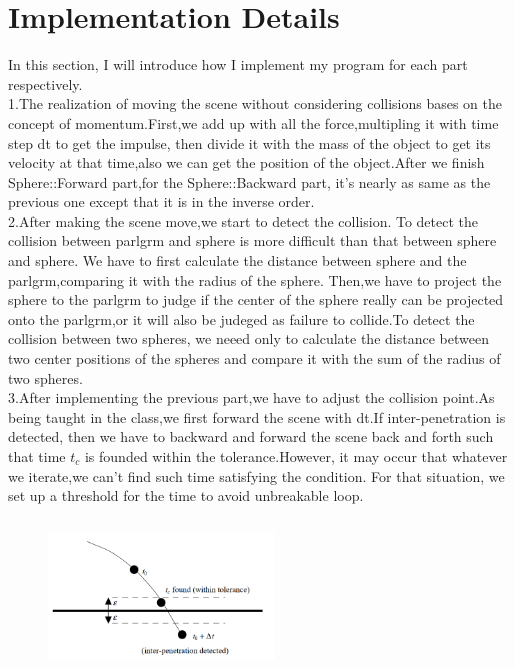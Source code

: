 \documentclass[acmtog]{acmart}
\begin{document}
\section{Implementation Details}
\qquad In this section, I will introduce how I implement my program for each part respectively.
\\\indent 1.The realization of moving the scene without considering collisions bases on the concept of momentum.First,we add up with all the force,multipling it with time step dt to get the impulse, then divide it with the mass of the object to get its velocity at that time,also we can get the position of the object.After we finish Sphere::Forward part,for the Sphere::Backward part, it's nearly as same as the previous one except that it is in the inverse order.
\\\indent 2.After making the scene move,we start to detect the collision. To detect the collision between parlgrm and sphere is more difficult than that between sphere and sphere. We have to first calculate the distance between sphere and the parlgrm,comparing it with the radius of the sphere. Then,we have to project the sphere to the parlgrm to judge if the center of the sphere really can be projected onto the parlgrm,or it will also be judeged as failure to collide.To detect the collision between two spheres, we neeed only to calculate the distance between two center positions of the spheres and compare it with the sum of the radius of two spheres.
\\\indent 3.After implementing the previous part,we have to adjust the collision point.As being taught in the class,we first forward the scene with dt.If inter-penetration is detected, then we have to backward and forward the scene back and forth such that time $t_c$ is founded within the tolerance.However, it may occur that whatever we iterate,we can't find such time satisfying the condition. For that situation, we set up a threshold for the time to avoid unbreakable loop.
\begin{figure}[h]
	\centering
	\includegraphics[width=6cm,height=4cm]{adjust.PNG}
\end{figure}
\end{document}
